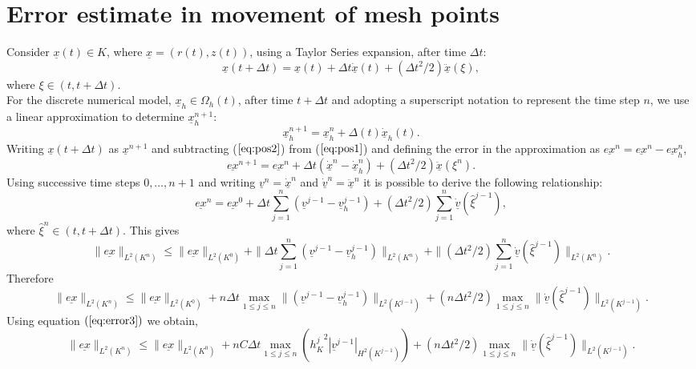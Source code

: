 \documentclass[11pt]{article}
\newcommand{\D}{\Delta}
\newcommand{\ul}{\underline}
\begin{document}
\section{Error estimate in movement of mesh points}
Consider $\ul{x}(t) \in K$, where $\ul{x} = (r(t),z(t))$, using a Taylor Series expansion, after time $\D{t}$:
\begin{equation}
\label{eq:pos1}
\ul{x}(t+\D{t}) = \ul{x}(t) + \D{t}\dot{\ul{x}}(t) +( \D{t}^2/2)\ddot{\ul{x}}(\xi),
\end{equation}
where $\xi \in (t, t+\D{t})$.\\
For the discrete numerical model, $\ul{x}_h \in \Omega_h(t)$, after time $t + \D{t}$ and adopting a superscript notation to represent the time step $n$, we use a linear approximation to determine $\ul{x}_h^{n+1}$:
\begin{equation}
\label{eq:pos2}
\ul{x}_h^{n+1} = \ul{x}_h^n + \D(t)\dot{\ul{x}}_h(t).
\end{equation}
Writing $\ul{x}(t+\D{t})$ as $\ul{x}^{n+1}$ and subtracting ($\ref{eq:pos2}$) from ($\ref{eq:pos1}$) and defining the error in the approximation as $\ul{ex}^n = \ul{ex}^n - \ul{ex}_h^n$,
\begin{equation}
\label{eq:err1}
\ul{ex}^{n+1} = \ul{ex}^n + \D{t}(\dot{\ul{x}}^n-\dot{\ul{x}}_h^n) + ( \D{t}^2/2)\ddot{\ul{x}}(\xi^n).
\end{equation}
Using successive time steps $0,\dots,n+1$ and writing $\ul{v}^n = \dot{\ul{x}}^n$ and $\dot{\ul{v}}^n = \ddot{\ul{x}}^n$  it is possible to derive the following relationship:
\begin{equation}
\label{eq:err2}
\ul{ex}^{n} = \ul{ex}^0 + \D{t}\sum_{j=1}^{n}(\ul{v}^{j-1}-\ul{v}_h^{j-1}) + ( \D{t}^2/2)\sum_{j=1}^{n}\dot{\ul{v}}(\hat{\xi}^{j-1}),
\end{equation}
where $\hat{\xi}^n \in (t,t+\D{t}).$ This gives
$$\|\ul{ex}\|_{L^{2}(K^n)} \leq \| \ul{ex}\|_{L^{2}(K^0)} + \|\D{t}\sum_{j=1}^{n}(\ul{v}^{j-1}-\ul{v}_h^{j-1})\|_{L^{2}(K^n)} + \|( \D{t}^2/2)\sum_{j=1}^{n}\dot{\ul{v}}(\hat{\xi}^{j-1})\|_{L^{2}(K^n)}.$$
Therefore
$$\|\ul{ex}\|_{L^{2}(K^n)} \leq \| \ul{ex}\|_{L^{2}(K^0)} + n\D{t}\max_{1 \leq j \leq n}\|(\ul{v}^{j-1}-\ul{v}_h^{j-1})\|_{L^{2}(K^{j-1})} + ( n\D{t}^2/2)\max_{1\leq j \leq n}\|\dot{\ul{v}}(\hat{\xi}^{j-1})\|_{L^{2}(K^{j-1})}.$$
Using equation $(\ref{eq:error3})$ we obtain,
\begin{equation}
\label{eq:err3}
\|\ul{ex}\|_{L^{2}(K^n)} \leq \| \ul{ex}\|_{L^{2}(K^0)} + nC\D{t}\max_{1 \leq j \leq n}\left({h_K^j}^2|\ul{v}^{j-1}|_{H^2(K^{j-1})}\right)  + ( n\D{t}^2/2)\max_{1\leq j \leq n}\|\dot{\ul{v}}(\hat{\xi}^{j-1})\|_{L^{2}(K^{j-1})}.
\end{equation}
\end{document}
